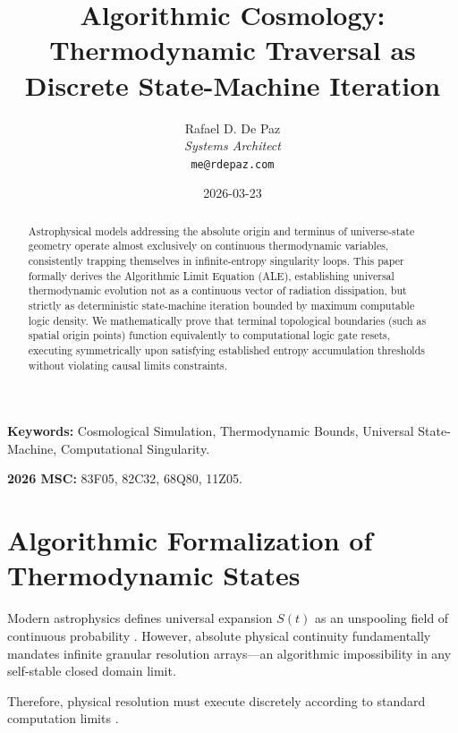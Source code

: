 \documentclass[12pt, a4paper]{article}
\theoremstyle{plain}
\theoremstyle{definition}
\begin{document}
\title{\textbf{Algorithmic Cosmology: Thermodynamic Traversal as Discrete State-Machine Iteration}}
\author{Rafael D. De Paz \\ \textit{Systems Architect} \\ \texttt{me@rdepaz.com}}
\date{2026-03-23}
\maketitle

\begin{abstract}
Astrophysical models addressing the absolute origin and terminus of universe-state geometry operate almost exclusively on continuous thermodynamic variables, consistently trapping themselves in infinite-entropy singularity loops. This paper formally derives the Algorithmic Limit Equation (ALE), establishing universal thermodynamic evolution not as a continuous vector of radiation dissipation, but strictly as deterministic state-machine iteration bounded by maximum computable logic density. We mathematically prove that terminal topological boundaries (such as spatial origin points) function equivalently to computational logic gate resets, executing symmetrically upon satisfying established entropy accumulation thresholds without violating causal limits constraints.
\end{abstract}

\vspace{0.5em}
\noindent\textbf{Keywords:} Cosmological Simulation, Thermodynamic Bounds, Universal State-Machine, Computational Singularity.

\vspace{0.5em}
\noindent\textbf{2026 MSC:} 83F05, 82C32, 68Q80, 11Z05.

\section{Algorithmic Formalization of Thermodynamic States}
Modern astrophysics defines universal expansion $S(t)$ as an unspooling field of continuous probability \cite{shannon1948mathematical}. However, absolute physical continuity fundamentally mandates infinite granular resolution arrays—an algorithmic impossibility in any self-stable closed domain limit. 

Therefore, physical resolution must execute discretely according to standard computation limits \cite{turing1936computable}.
\end{document}
